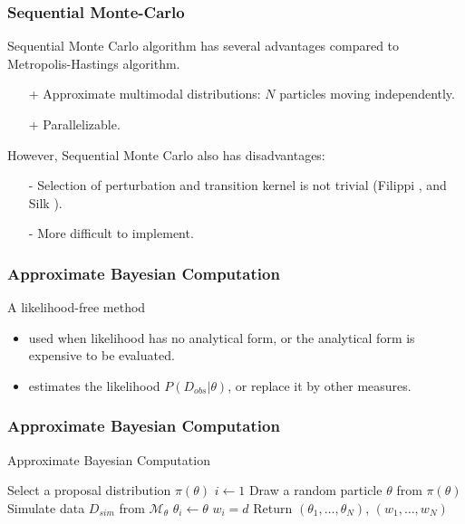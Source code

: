 \documentclass{beamer}
\begin{document}
\begin{frame}
    \frametitle{Sequential Monte-Carlo}
    Sequential Monte Carlo algorithm has several advantages compared to Metropolis-Hastings
    algorithm.
    \begin{itemize}
        \item[+] Approximate multimodal distributions: $N$ particles moving independently.
        \item[+] Parallelizable.
    \end{itemize}
    However, Sequential Monte Carlo also has disadvantages:
    \begin{itemize}
        \item[-] Selection of perturbation and transition kernel is not trivial (Filippi
              \cite{filippi2013optimality}, and Silk \cite{silk2012optimizing}).
        \item[-] More difficult to implement.
    \end{itemize}
\end{frame}

\begin{frame}
    \frametitle{Approximate Bayesian Computation}
    A likelihood-free method
    \begin{itemize}
        \item used when likelihood has no analytical form, or the analytical form is
              expensive to be evaluated.
        \item estimates the likelihood $P(D_{obs}|\theta)$, or replace it by other
              measures.
    \end{itemize}
\end{frame}

\begin{frame}
    \frametitle{Approximate Bayesian Computation}
    \footnotesize{
        \begin{algorithm}[H]
            \caption{Approximate Bayesian Computation}
            \label{alg:abc-reject}
            \begin{algorithmic}[1]
                \State Select a proposal distribution $\pi(\theta)$
                \State $i \leftarrow 1$
                \State Draw a random particle $\theta$ from $\pi(\theta)$
                \State Simulate data $D_{sim}$ from $\mathcal{M}_\theta$
                \State $\theta_i \leftarrow \theta$
                \State $w_i = d$
                \EndIf
                \EndWhile
                \State Return $(\theta_1,\ldots,\theta_N)$, $(w_1,\ldots,w_N)$
                \EndProcedure
            \end{algorithmic}
        \end{algorithm}
    }
\end{frame}
\end{document}
